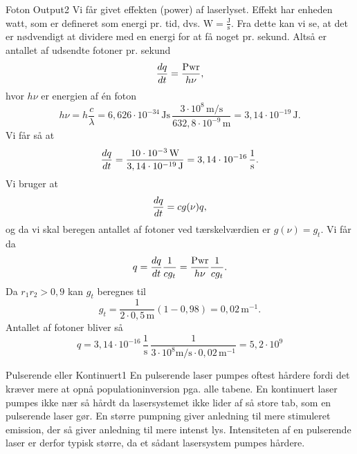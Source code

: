 \begin{opgave}{Foton Output}{2}
\opg Vi får givet effekten (power) af laserlyset. Effekt har enheden watt, som er defineret som energi pr. tid, dvs. $\text{W} = \frac{\text{J}}{\text{s}}$. Fra dette kan vi se, at det er nødvendigt at dividere med en energi for at få noget pr. sekund. Altså er antallet af udsendte fotoner pr. sekund 
\begin{equation}
{d{q} \over d{t}} = \frac{\text{Pwr}}{h\nu},
\end{equation}
hvor $h\nu$ er energien af én foton
\begin{equation}
h\nu = h \frac{c}{\lambda} = 6,626\cdot 10^{-34}\, \text{Js} \, \frac{3\cdot10^{8}\,\text{m/s}}{632,8\cdot 10^{-9}\, \text{m}} = 3,14\cdot 10^{-19}\, \text{J}.
\end{equation}
Vi får så at 
\begin{equation}
{d{q} \over d{t}} = \frac{10\cdot10^{-3}\,\text{W}}{3,14\cdot 10^{-19}\,\text{J}} = 3,14\cdot 10^{-16}\, \frac{1}{\text{s}}.
\end{equation}
\opg Vi bruger at 
\begin{equation}
{d{q} \over d{t}} = cg(\nu)q, 
\end{equation}
og da vi skal beregen antallet af fotoner ved tærskelværdien er $g(\nu) = g_t$. Vi får da 
\begin{equation}
q = {d{q} \over d{t}}\frac{1}{cg_t} = \frac{\text{Pwr}}{h\nu}\frac{1}{cg_t}.
\end{equation}
Da $r_1r_2>0,9$ kan $g_t$ beregnes til 
\begin{equation}
g_t = \frac{1}{2\cdot 0,5 \, \text{m}}(1-0,98) = 0,02\, \text{m}^{-1}. 
\end{equation}
Antallet af fotoner bliver så 
\begin{equation}
q = 3,14\cdot 10^{-16}\, \frac{1}{\text{s}}\, \frac{1}{3\cdot 10^{8} \text{m/s}\cdot 0,02 \, \text{m}^{-1}} = 5,2\cdot 10^9
\end{equation}
\end{opgave}

\begin{opgave}{Pulserende eller Kontinuert}{1}
\opg En pulserende laser pumpes oftest hårdere fordi det kræver mere at opnå populationinversion pga. alle tabene. En kontinuert laser pumpes ikke nær så hårdt da lasersystemet ikke lider af så store tab, som en pulserende laser gør. En større pumpning giver anledning til mere stimuleret emission, der så giver anledning til mere intenst lys. Intensiteten af en pulserende laser er derfor typisk større, da et sådant lasersystem pumpes hårdere. 
\end{opgave}


